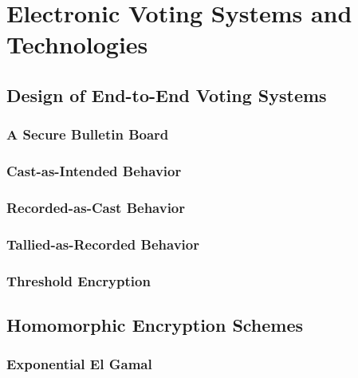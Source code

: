 \chapter{Electronic Voting Systems and Technologies} \label{evote}


\section{Design of End-to-End Voting Systems} \label{evote:design}


\subsection{A Secure Bulletin Board} \label{evote:design:sbb}

\subsection{Cast-as-Intended Behavior} \label{evote:design:castasintended}

\subsection{Recorded-as-Cast Behavior} \label{evote:design:recordedascast}

\subsection{Tallied-as-Recorded Behavior} \label{evote:design:talliedasrecorded}

\subsection{Threshold Encryption} \label{evote:design:threshold}

\section{Homomorphic Encryption Schemes} \label{evote:homomorphic}

\subsection{Exponential El Gamal} \label{evote:homomorphic:elgamal}

